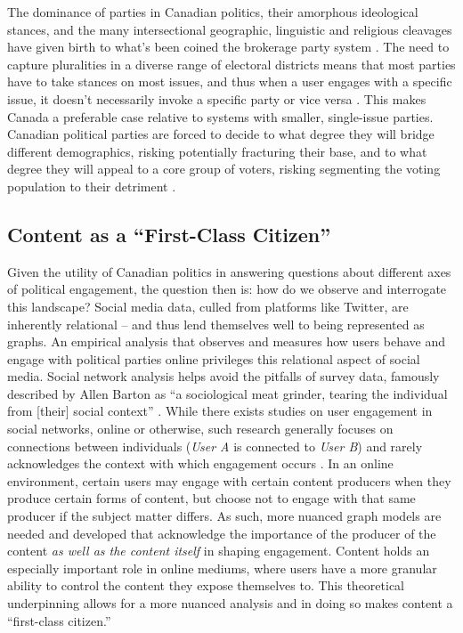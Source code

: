 The dominance of parties in Canadian politics, their amorphous ideological
stances, and the many intersectional geographic, linguistic and religious
cleavages have given birth to what’s been coined the brokerage party system
\cite{carty2010political}. The need to capture pluralities in a diverse range of
electoral districts means that most parties have to take stances on most issues,
and thus when a user engages with a specific issue, it doesn’t necessarily
invoke a specific party or vice versa \cite{franklin1992decline}. This makes Canada a preferable case
relative to systems with smaller, single-issue parties. Canadian political
parties are forced to decide to what degree they will bridge different
demographics, risking potentially fracturing their base, and to what degree they
will appeal to a core group of voters, risking segmenting the voting population
to their detriment \cite{franklin1992decline}. 

\subsection{Content as a ``First-Class Citizen''}

Given the utility of Canadian politics in answering questions about different
axes of political engagement, the question then is: how do we observe and
interrogate this landscape? Social media data, culled from platforms like
Twitter, are inherently relational -- and thus lend themselves well to being
represented as graphs. An empirical analysis that observes and measures how
users behave and engage with political parties online privileges this relational
aspect of social media. Social network analysis helps avoid the pitfalls of
survey data, famously described by Allen Barton as “a sociological meat grinder,
tearing the individual from [their] social context”
\cite{freeman2004development}. While there exists studies on user engagement in
social networks, online or otherwise, such research generally focuses on
connections between individuals (\emph{User A} is connected to \emph{User B})
and rarely acknowledges the context with which engagement occurs
\cite{Zhang2017FindingCU,kavanaugh2002community,hofer2013perceived,miller2015talking}. In an online environment,
certain users may engage with certain content producers when they produce
certain forms of content, but choose not to engage with that same producer if
the subject matter differs. As such, more nuanced graph models are needed and
developed that acknowledge the importance of the producer of the content
\emph{as well as the content itself} in shaping engagement. Content holds an
especially important role in online mediums, where users have a more granular
ability to control the content they expose themselves to. This theoretical
underpinning allows for a more nuanced analysis and in doing so makes content a
``first-class citizen.''


